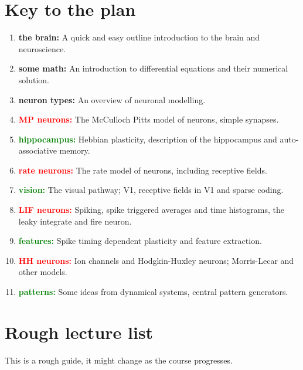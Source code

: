 \documentclass[11pt,a4paper]{scrartcl}
\begin{document}
\section*{Key to the plan}


\begin{enumerate}[label=(\alph*)]
\item \textbf{the brain:} A quick and easy outline introduction to the brain and neuroscience.
\item \textbf{some math:} An introduction to differential equations and their numerical solution.
\item \textbf{neuron types:} An overview of neuronal modelling.
\item \textbf{\textcolor{red}{MP neurons:}} The McCulloch Pitts model of neurons, simple synapses.
\item \textbf{\textcolor{green}{hippocampus:}} Hebbian plasticity, description of the hippocampus and auto-associative memory.
\item \textbf{\textcolor{red}{rate neurons:}} The rate model of neurons, including
  receptive fields.
\item \textbf{\textcolor{green}{vision:}} The visual pathway; V1, receptive fields in V1 and sparse coding.
\item \textbf{\textcolor{red}{LIF neurons:}} Spiking, spike triggered averages and time histograms, the leaky integrate and fire neuron.
\item \textbf{\textcolor{green}{features:}} Spike timing dependent plasticity and feature extraction.
\item \textbf{\textcolor{red}{HH neurons:}} Ion channels and Hodgkin-Huxley neurons;
  Morris-Lecar and other models.
\item \textbf{\textcolor{green}{patterns:}} Some ideas from dynamical systems, central pattern generators.
\end{enumerate}

\section*{Rough lecture list}
This is a rough guide, it might change as the course progresses.
\end{document}
